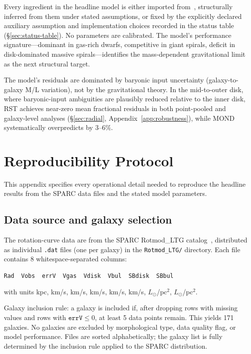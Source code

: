 \documentclass[11pt,a4paper]{article}
\begin{document}
Every ingredient in the headline model is either imported from~\cite{Wells2026a,Wells2026b,Wells2026c}, structurally inferred from them under stated assumptions, or fixed by the explicitly declared auxiliary assumption and implementation choices recorded in the status table (\S\ref{sec:status-table}).
No parameters are calibrated.
The model's performance signature---dominant in gas-rich dwarfs, competitive in giant spirals, deficit in disk-dominated massive spirals---identifies the mass-dependent gravitational limit as the next structural target.

The model's residuals are dominated by baryonic input uncertainty (galaxy-to-galaxy M/L variation), not by the gravitational theory.
In the mid-to-outer disk, where baryonic-input ambiguities are plausibly reduced relative to the inner disk, RST achieves near-zero mean fractional residuals in both point-pooled and galaxy-level analyses (\S\ref{sec:radial}, Appendix~\ref{app:robustness}), while MOND systematically overpredicts by $3$--$6\%$.

\appendix

\section{Reproducibility Protocol}
\label{app:reproducibility}

This appendix specifies every operational detail needed to reproduce the headline results from the SPARC data files and the stated model parameters.

\subsection{Data source and galaxy selection}

The rotation-curve data are from the SPARC Rotmod\_LTG catalog~\cite{Lelli2016}, distributed as individual \texttt{.dat} files (one per galaxy) in the \texttt{Rotmod\_LTG/} directory.
Each file contains 8 whitespace-separated columns:
\begin{center}
\texttt{Rad~~Vobs~~errV~~Vgas~~Vdisk~~Vbul~~SBdisk~~SBbul}
\end{center}
with units kpc, km/s, km/s, km/s, km/s, km/s, $L_\odot$/pc$^2$, $L_\odot$/pc$^2$.

Galaxy inclusion rule: a galaxy is included if, after dropping rows with missing values and rows with $\texttt{errV} \leq 0$, at least 5 data points remain.
This yields 171 galaxies.
No galaxies are excluded by morphological type, data quality flag, or model performance.
Files are sorted alphabetically; the galaxy list is fully determined by the inclusion rule applied to the SPARC distribution.
\end{document}
